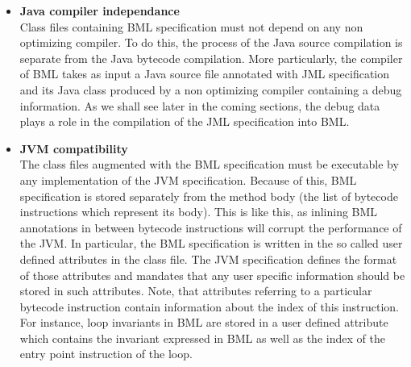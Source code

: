 \begin{itemize}

\item \textbf{Java compiler independance } \\
      Class files containing BML specification must not depend on 
      any non optimizing compiler. 
      To do this, the process of the Java source compilation is separate from the Java bytecode compilation. 
      More particularly, the compiler of BML takes as input a Java source file annotated with JML
      specification and its Java class produced by a non optimizing compiler containing a
      debug information. As we shall see later in the coming sections, the debug data plays a role in the
      compilation of the JML specification into BML.
      

\item \textbf{JVM compatibility } \\
            The class files augmented with the BML specification must be executable by any implementation of the JVM specification. 
            Because of this, BML specification is stored separately from the method body (the list of bytecode instructions which represent its body).
	    This is like this, as inlining BML annotations in between bytecode instructions will corrupt 
	    the performance of the JVM. 
	    In particular, the BML specification is written in the so
	    called user defined attributes in the class file.
	    The JVM specification defines the format of those attributes and mandates that any
	    user specific information should be stored in such attributes. 
	    Note, that attributes referring to a particular bytecode instruction contain
	    information about the index of this instruction. For instance,  loop invariants in BML are stored
	    in a user defined attribute which  contains the invariant expressed in BML as well as
	    the index of the entry point instruction of the loop.
 

\end{itemize}
